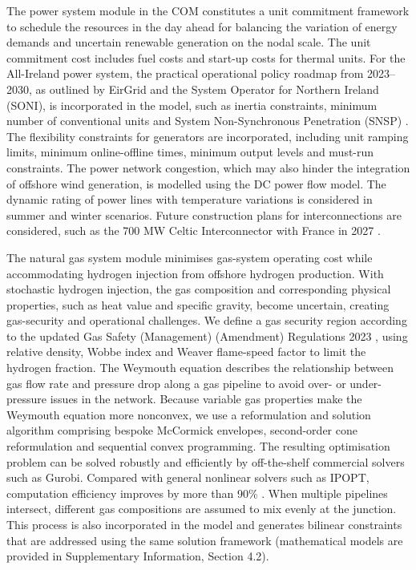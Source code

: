 \documentclass[pdflatex,lineno,sn-mathphys,Numbered]{sn-jnl}%
\begin{document}
The power system module in the COM constitutes a unit commitment framework to schedule the resources in the day ahead for balancing the variation of energy demands and uncertain renewable generation on the nodal scale. The unit commitment cost includes fuel costs and start-up costs for thermal units. For the All-Ireland power system, the practical operational policy roadmap from 2023--2030, as outlined by EirGrid and the System Operator for Northern Ireland (SONI), is incorporated in the model, such as inertia constraints, minimum number of conventional units and System Non-Synchronous Penetration (SNSP) \cite{OperationalPolicyRoadmap}.
The flexibility constraints for generators are incorporated, including unit ramping limits, minimum online-offline times, minimum output levels and must-run constraints.
The power network congestion, which may also hinder the integration of offshore wind generation, is modelled using the DC power flow model. The dynamic rating of power lines with temperature variations is considered in summer and winter scenarios.
Future construction plans for interconnections are considered, such as the 700 MW Celtic Interconnector with France in 2027 \cite{CelticInterconnector}.

The natural gas system module minimises gas-system operating cost while accommodating hydrogen injection from offshore hydrogen production. With stochastic hydrogen injection, the gas composition and corresponding physical properties, such as heat value and specific gravity, become uncertain, creating gas-security and operational challenges. We define a gas security region according to the updated Gas Safety (Management) (Amendment) Regulations 2023 \cite{TheGasSafety2023}, using relative density, Wobbe index and Weaver flame-speed factor to limit the hydrogen fraction. The Weymouth equation describes the relationship between gas flow rate and pressure drop along a gas pipeline to avoid over- or under-pressure issues in the network. Because variable gas properties make the Weymouth equation more nonconvex, we use a reformulation and solution algorithm comprising bespoke McCormick envelopes, second-order cone reformulation and sequential convex programming. The resulting optimisation problem can be solved robustly and efficiently by off-the-shelf commercial solvers such as Gurobi. Compared with general nonlinear solvers such as IPOPT, computation efficiency improves by more than 90\% \cite{wang2023optimal}.
When multiple pipelines intersect, different gas compositions are assumed to mix evenly at the junction. This process is also incorporated in the model and generates bilinear constraints that are addressed using the same solution framework (mathematical models are provided in Supplementary Information, Section 4.2).
\end{document}
